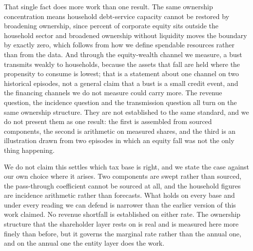 That single fact does more work than one result. The same ownership concentration means
household debt-service capacity cannot be restored by broadening ownership, since
 percent of corporate equity sits outside the household sector
and broadened ownership without liquidity moves the boundary by exactly zero, which follows from
how we define spendable resources rather than from the data. And through the equity-wealth
channel we measure, a bust transmits weakly to households, because the assets that fall are held
where the propensity to consume is lowest; that is a statement about one channel on two
historical episodes, not a general claim that a bust is a small credit event, and the financing
channels we do not measure could carry more. The revenue question, the incidence question and the transmission
question all turn on the same ownership structure. They are not established to the same
standard, and we do not present them as one result: the first is assembled from sourced
components, the second is arithmetic on measured shares, and the third is an illustration drawn
from two episodes in which an equity fall was not the only thing happening.

We do not claim this settles which tax base is right, and we state the case against our own
choice where it arises. Two components are swept rather than sourced, the pass-through
coefficient cannot be sourced at all, and the household figures are incidence arithmetic rather
than forecasts. What holds on every base and under every reading we can defend is
narrower than the earlier version of this work claimed. No revenue shortfall is established on
either rate. The ownership structure that the shareholder layer rests on is real and is measured
here more finely than before, but it governs the marginal rate rather than the annual one, and on
the annual one the entity layer does the work.
